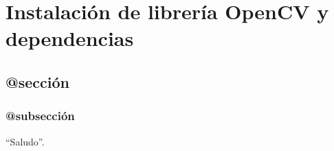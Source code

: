 \chapter{Instalación de librería OpenCV y dependencias}
\label{apendiceA}


\section{@sección}

\subsection{@subsección}

``Saludo''.


